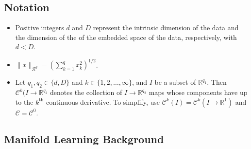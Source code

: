 \subsection*{Notation}
\begin{itemize}
    \item Positive integers $d$ and $D$ represent the intrinsic dimension of the data and the dimension of the of the embedded space of the data, respectively, with $d < D$.
    \item $\|x\|_{\mathcal{R}^q} = \left(\sum_{k=1}^{q} x_k^2\right)^{1/2}$.
    \item Let $q_1, q_2 \in \{d, D\}$ and $k \in \{1, 2, \dots, \infty\}$, and $I$ be a subset of $\mathbb{R}^{q_1}$. Then $\mathcal{C}^k(I \to \mathbb{R}^{q_2}$ denotes the collection of $I \to \mathbb{R}^{q_2}$ maps whose components have up to the $k^{\text{th}}$ continuous derivative. To simplify, use $\mathcal{C}^k(I) = \mathcal{C}^k(I \to \mathbb{R}^1)$ and $\mathcal{C} = \mathcal{C^0}$.
\end{itemize}

\subsection*{Manifold Learning Background}

